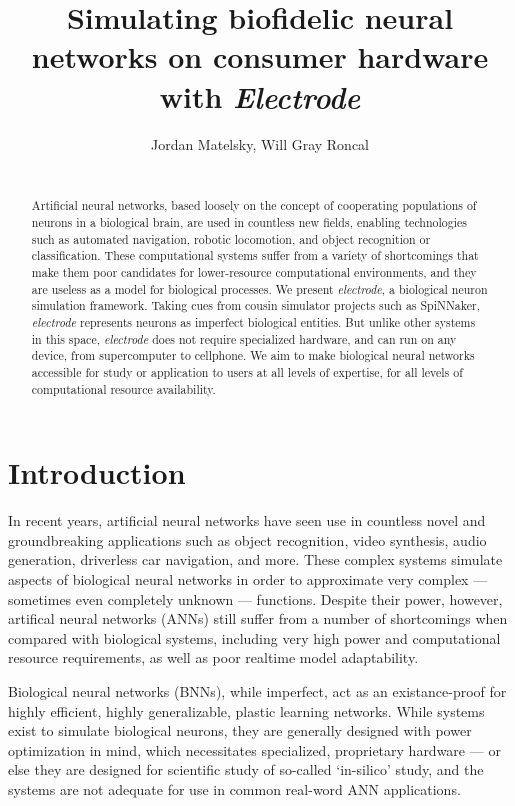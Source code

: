 \documentclass[letter, twocolumn]{article}
\title{Simulating biofidelic neural networks on consumer hardware with \textit{Electrode}}
\author{
	Jordan Matelsky,
    Will Gray Roncal \\ \\
    \institution{
    	Johns Hopkins University; Baltimore, Maryland \\
    Correspondence: jordan.matelsky@jhu.edu
    }
}
\begin{document}
\maketitle

\begin{abstract}
Artificial neural networks, based loosely on the concept of cooperating populations of neurons in a biological brain, are used in countless new fields, enabling technologies such as automated navigation, robotic locomotion, and object recognition or classification. These computational systems suffer from a variety of shortcomings that make them poor candidates for lower-resource computational environments, and they are useless as a model for biological processes. We present \textit{electrode}, a biological neuron simulation framework. Taking cues from cousin simulator projects such as SpiNNaker, \textit{electrode} represents neurons as imperfect biological entities. But unlike other systems in this space, \textit{electrode} does not require specialized hardware, and can run on any device, from supercomputer to cellphone. We aim to make biological neural networks accessible for study or application to users at all levels of expertise, for all levels of computational resource availability.
\end{abstract}


\section{Introduction}
In recent years, artificial neural networks have seen use in countless novel and groundbreaking applications such as object recognition, video synthesis, audio generation, driverless car navigation, and more. These complex systems simulate aspects of biological neural networks in order to approximate very complex --- sometimes even completely unknown --- functions. Despite their power, however, artifical neural networks (ANNs) still suffer from a number of shortcomings when compared with biological systems, including very high power and computational resource requirements, as well as poor realtime model adaptability.

Biological neural networks (BNNs), while imperfect, act as an existance-proof for highly efficient, highly generalizable, plastic learning networks. While systems exist to simulate biological neurons, they are generally designed with power optimization in mind, which necessitates specialized, proprietary hardware --- or else they are designed for scientific study of so-called `in-silico' study, and the systems are not adequate for use in common real-word ANN applications.
\end{document}
